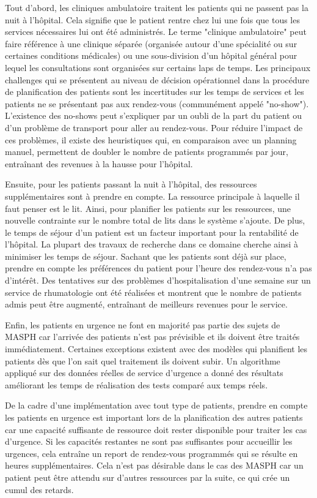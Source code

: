 \documentclass[noposter]{polytech/polytech}
\begin{document}
Tout d'abord, les cliniques ambulatoire traitent les patients qui ne passent pas la nuit à l'hôpital. Cela signifie que le patient rentre chez lui une fois que tous les services nécessaires lui ont été administrés. Le terme "clinique ambulatoire" peut faire référence à une clinique séparée (organisée autour d'une spécialité ou sur certaines conditions médicales) ou une sous-division d'un hôpital général pour lequel les consultations sont organisées sur certains laps de temps. Les principaux challenges qui se présentent au niveau de décision opérationnel dans la procédure de planification des patients sont les incertitudes sur les temps de services et les patients ne se présentant pas aux rendez-vous (communément appelé "no-show"). L'existence des no-shows peut s'expliquer par un oubli de la part du patient ou d'un problème de transport pour aller au rendez-vous. Pour réduire l'impact de ces problèmes, il existe des heuristiques qui, en comparaison avec un planning manuel, permettent de doubler le nombre de patients programmés par jour, entraînant des revenues à la hausse pour l'hôpital.

Ensuite, pour les patients passant la nuit à l'hôpital, des ressources supplémentaires sont à prendre en compte. La ressource principale à laquelle il faut penser est le lit. Ainsi, pour planifier les patients sur les ressources, une nouvelle contrainte sur le nombre total de lits dans le système s'ajoute. De plus, le temps de séjour d'un patient est un facteur important pour la rentabilité de l'hôpital. La plupart des travaux de recherche dans ce domaine cherche ainsi à minimiser les temps de séjour. Sachant que les patients sont déjà sur place, prendre en compte les préférences du patient pour l'heure des rendez-vous n'a pas d'intérêt. Des tentatives sur des problèmes d'hospitalisation d'une semaine sur un service de rhumatologie ont été réalisées et montrent que le nombre de patients admis peut être augmenté, entraînant de meilleurs revenues pour le service.

Enfin, les patients en urgence ne font en majorité pas partie des sujets de MASPH car l'arrivée des patients n'est pas prévisible et ils doivent être traités immédiatement. Certaines exceptions existent avec des modèles qui planifient les patients dès que l'on sait quel traitement ils doivent subir. Un algorithme appliqué sur des données réelles de service d'urgence a donné des résultats améliorant les temps de réalisation des tests comparé aux temps réels.

De la cadre d'une implémentation avec tout type de patients, prendre en compte les patients en urgence est important lors de la planification des autres patients car une capacité suffisante de ressource doit rester disponible pour traiter les cas d'urgence. Si les capacités restantes ne sont pas suffisantes pour accueillir les urgences, cela entraîne un report de rendez-vous programmés qui se résulte en heures supplémentaires. Cela n'est pas désirable dans le cas des MASPH car un patient peut être attendu sur d'autres ressources par la suite, ce qui crée un cumul des retards.
\end{document}
